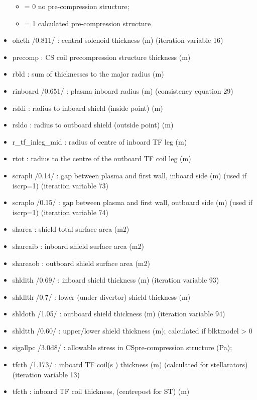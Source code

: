 \documentclass[]{article}
\providecommand{\tightlist}{%
  \setlength{\itemsep}{0pt}\setlength{\parskip}{0pt}}
\begin{document}
\begin{itemize}
  \begin{itemize}
  \tightlist
  \item
    = 0 no pre-compression structure;
  \item
    = 1 calculated pre-compression structure
  \end{itemize}
\item
  ohcth /0.811/ : central solenoid thickness (m) (iteration variable 16)
\item
  precomp : CS coil precompression structure thickness (m)
\item
  rbld : sum of thicknesses to the major radius (m)
\item
  rinboard /0.651/ : plasma inboard radius (m) (consistency equation 29)
\item
  rsldi : radius to inboard shield (inside point) (m)
\item
  rsldo : radius to outboard shield (outside point) (m)
\item
  r\_tf\_inleg\_mid : radius of centre of inboard TF leg (m)
\item
  rtot : radius to the centre of the outboard TF coil leg (m)
\item
  scrapli /0.14/ : gap between plasma and first wall, inboard side (m)
  (used if iscrp=1) (iteration variable 73)
\item
  scraplo /0.15/ : gap between plasma and first wall, outboard side (m)
  (used if iscrp=1) (iteration variable 74)
\item
  sharea : shield total surface area (m2)
\item
  shareaib : inboard shield surface area (m2)
\item
  shareaob : outboard shield surface area (m2)
\item
  shldith /0.69/ : inboard shield thickness (m) (iteration variable 93)
\item
  shldlth /0.7/ : lower (under divertor) shield thickness (m)
\item
  shldoth /1.05/ : outboard shield thickness (m) (iteration variable 94)
\item
  shldtth /0.60/ : upper/lower shield thickness (m); calculated if
  blktmodel \textgreater{} 0
\item
  sigallpc /3.0d8/ : allowable stress in CSpre-compression structure
  (Pa);
\item
  tfcth /1.173/ : inboard TF coil(s ) thickness (m) (calculated for
  stellarators) (iteration variable 13)
\item
  tfcth : inboard TF coil thickness, (centrepost for ST) (m)

\end{itemize}
\end{document}
